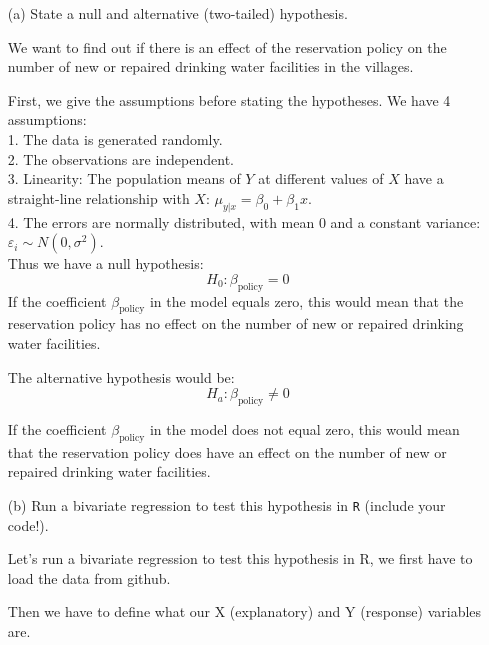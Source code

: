 \documentclass[12pt,letterpaper]{article}
\begin{document}
\newpage
\begin{enumerate}
	\item [(a)] State a null and alternative (two-tailed) hypothesis. 
	
	We want to find out if there is an effect of the reservation policy on the number of new or repaired drinking water facilities in the villages.
	
	First, we give the assumptions before stating the hypotheses. We have 4 assumptions:\\
	1. The data is generated randomly. \\
	2. The observations are independent. \\
	3. Linearity: The population means of \( Y \) at different values of \( X \) have a straight-line relationship with \( X \): \( \mu_{y|x} = \beta_0 + \beta_1 x \). \\
	4. The errors are normally distributed, with mean 0 and a constant variance:\\ \( \varepsilon_i \sim N(0, \sigma^2) \). \\
	
	Thus we have a null hypothesis:
	\[
	H_0: \beta_{\text{policy}} = 0
	\]
	If the coefficient \( \beta_{\text{policy}} \) in the model equals zero, this would mean that the reservation policy has no effect on the number of new or repaired drinking water facilities. 
	
	The alternative hypothesis would be:
	\[
	H_a: \beta_{\text{policy}} \neq 0
	\]
	
	If the coefficient \( \beta_{\text{policy}} \) in the model does not equal zero, this would mean that the reservation policy does have an effect on the number of new or repaired drinking water facilities.
	
	
	\vspace{1cm}
	\item [(b)] Run a bivariate regression to test this hypothesis in \texttt{R} (include your code!).
	
	Let's run a bivariate regression to test this hypothesis in R, we first have to load the data from github. 
	
	
	
	Then we have to define what our X (explanatory) and Y (response) variables are.
	
	
	

\end{enumerate}
\end{document}
